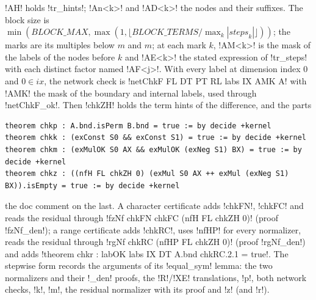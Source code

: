 {{{\begin{lstlisting}[style=lexlean]
\end{lstlisting}
\lexlean!AH! holds \lexpy!tr_hints!; \lexlean!An<k>! and \lexlean!AD<k>! the nodes and their suffixes. The
block size is $\min(\mathit{BLOCK\_MAX}, \max(1, \lfloor \mathit{BLOCK\_TERMS} / \max_k
|\mathit{steps}_k|\rfloor))$; the marks are its multiples below $m$ and $m$; at each mark $k$,
\lexlean!AM<k>! is the mask of the labels of the nodes before $k$ and \lexlean!AE<k>! the stated
expression of \lexpy!tr_steps! with each distinct factor named \lexlean!AF<j>!. With every label at
dimension index 0 and $0\in ix$, the network check is \lexlean!netChkF FL DT PT RL labs IX AMK A!
with \lexlean!AMK! the mask of the boundary and internal labels, used through \lexlean!netChkF_ok!.
Then \lexlean!chkZH! holds the term hints of the difference, and the parts
\begin{lstlisting}[style=lexlean]
theorem chkp : A.bnd.isPerm B.bnd = true := by decide +kernel
theorem chkk : (exConst S0 && exConst S1) = true := by decide +kernel
theorem chkm : (exMulOK S0 AX && exMulOK (exNeg S1) BX) = true := by decide +kernel
theorem chkz : ((nfH FL chkZH 0) (exMul S0 AX ++ exMul (exNeg S1) BX)).isEmpty = true := by decide +kernel
\end{lstlisting}
the doc comment on the last. A character certificate adds \lexlean!chkFN!, \lexlean!chkFC! and reads
the residual through \lexlean!fzNf chkFN chkFC (nfH FL chkZH 0)! (proof \lexlean!fzNf_den!); a range
certificate adds \lexlean!chkRC!, uses \lexlean!nfHP! for every normalizer, reads the residual through
\lexlean!rgNf chkRC (nfHP FL chkZH 0)! (proof \lexlean!rgNf_den!) and adds
\lexlean!theorem chkr : labOK labs IX DT A.bnd chkRC.2.1 = true!. The stepwise form records the
arguments of its \lexlean!equal_sym! lemma: the two normalizers and their \lexlean!_den! proofs, the
\lexlean!R!/\lexlean!XE! translations, \lexlean!p!, both network checks, \lexlean!k!, \lexlean!m!, the
residual normalizer with its proof and \lexlean!z! (and \lexlean!r!).

}}}

